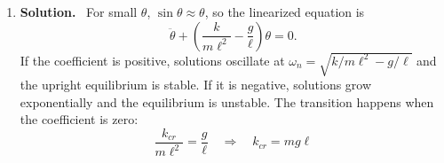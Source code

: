 \documentclass[11pt,letterpaper]{article}
\newenvironment{solution}{\par\smallskip\color{blue!60!black}\textbf{Solution.}\ }{\par}
\begin{document}
\vspace{4pt}
\begin{enumerate}[label=\textbf{\arabic*.}, leftmargin=*, itemsep=10pt]
\item[] \begin{solution}
For small $\theta$, $\sin\theta \approx \theta$, so the linearized equation is
\[
\ddot\theta + \left(\frac{k}{m\ell^2} - \frac{g}{\ell}\right)\theta = 0 .
\]
If the coefficient is positive, solutions oscillate at $\omega_n = \sqrt{k/m\ell^2 - g/\ell}$ and the upright equilibrium is stable. If it is negative, solutions grow exponentially and the equilibrium is unstable. The transition happens when the coefficient is zero:
\[
\frac{k_{cr}}{m\ell^2} = \frac{g}{\ell} \quad\Longrightarrow\quad \boxed{k_{cr} = mg\ell}
\]
\end{solution}
\end{enumerate}
\end{document}
